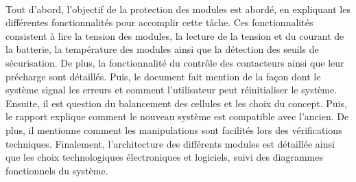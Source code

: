 		\paragraph*{}
		Tout d'abord, l'objectif de la protection des modules est abordé, en expliquant les différentes fonctionnalités pour accomplir cette tâche. Ces fonctionnalités consistent à lire la tension des modules, la lecture de la tension et du courant de la batterie, la température des modules ainsi que la détection des seuils de sécurisation. De plus, la fonctionnalité du contrôle des contacteurs ainsi que leur précharge sont détaillés. Puis, le document fait mention de la façon dont le système signal les erreurs et comment l'utilisateur peut réinitialiser le système.	Ensuite, il est question du balancement des cellules et les choix du concept. Puis, le rapport explique comment le nouveau système est compatible avec l'ancien. De plus, il mentionne comment les manipulations sont facilités lors des vérifications techniques. Finalement, l'architecture des différents modules est détaillée ainsi que les choix technologiques électroniques et logiciels, suivi des diagrammes fonctionnels du système.
	
			
